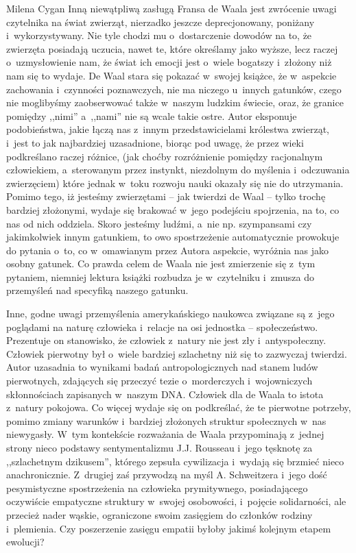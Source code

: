 \begin{recplenv}{Milena Cygan}
Inną niewątpliwą zasługą Fransa de Waala jest zwrócenie uwagi czytelnika na świat zwierząt, nierzadko jeszcze
deprecjonowany, poniżany i~wykorzystywany. Nie tyle chodzi mu o~dostarczenie dowodów na to, że zwierzęta posiadają
uczucia, nawet te, które określamy jako wyższe, lecz raczej o~uzmysłowienie nam, że świat ich emocji jest o~wiele
bogatszy i~złożony niż nam się to wydaje. De Waal stara się pokazać w~swojej książce, że w~aspekcie
zachowania i~czynności poznawczych, nie ma niczego u~innych gatunków, czego nie moglibyśmy zaobserwować także w~naszym ludzkim
świecie, oraz, że granice pomiędzy ,,nimi'' a~,,nami'' nie są wcale takie ostre. Autor eksponuje podobieństwa, jakie łączą
nas z~innym przedstawicielami królestwa zwierząt, i~jest to jak najbardziej uzasadnione, biorąc pod uwagę, że przez
wieki podkreślano raczej różnice, (jak choćby rozróżnienie pomiędzy racjonalnym człowiekiem, a~sterowanym przez
instynkt, niezdolnym do myślenia i~odczuwania zwierzęciem) które jednak w~toku rozwoju nauki okazały się nie do
utrzymania. Pomimo tego, iż jesteśmy zwierzętami -- jak twierdzi de Waal -- tylko trochę bardziej złożonymi, wydaje się
brakować w~jego podejściu spojrzenia, na to, co nas od nich oddziela. Skoro jesteśmy ludźmi, a~nie np. szympansami czy
jakimkolwiek innym gatunkiem, to owo spostrzeżenie automatycznie prowokuje do pytania o~to, co w~omawianym przez Autora
aspekcie, wyróżnia nas jako osobny gatunek. Co prawda celem de Waala nie jest zmierzenie się z~tym pytaniem, niemniej
lektura książki rozbudza je w~czytelniku i~zmusza do przemyśleń nad specyfiką naszego gatunku.

\enlargethispage{-.5\baselineskip}

Inne, godne uwagi przemyślenia amerykańskiego naukowca związane są z~jego poglądami na naturę człowieka i~relacje na osi
jednostka -- społeczeństwo. Prezentuje on stanowisko, że człowiek z~natury nie jest zły i~antyspołeczny. Człowiek
pierwotny był o~wiele bardziej szlachetny niż się to zazwyczaj twierdzi. Autor uzasadnia to wynikami badań
antropologicznych nad stanem ludów pierwotnych, zdających się przeczyć tezie o~morderczych i~wojowniczych skłonnościach
zapisanych w~naszym DNA. Człowiek dla de Waala to istota z~natury pokojowa. Co więcej wydaje się on podkreślać, że te
pierwotne potrzeby, pomimo zmiany warunków i~bardziej złożonych struktur społecznych w~nas niewygasły. W~tym kontekście
rozważania de Waala przypominają z~jednej strony nieco podstawy sentymentalizmu J.J. Rousseau i~jego tęsknotę za
,,szlachetnym dzikusem'', którego zepsuła cywilizacja i~wydają się brzmieć nieco anachronicznie. Z~drugiej zaś przywodzą
na myśl A. Schweitzera i~jego dość pesymistyczne spostrzeżenia na człowieka prymitywnego, posiadającego oczywiście
empatyczne struktury w~swojej osobowości, i~pojęcie solidarności, ale przecież nader wąskie, ograniczone swoim
zasięgiem do członków rodziny i~plemienia. Czy poszerzenie zasięgu empatii byłoby jakimś kolejnym etapem ewolucji?


\end{recplenv}
